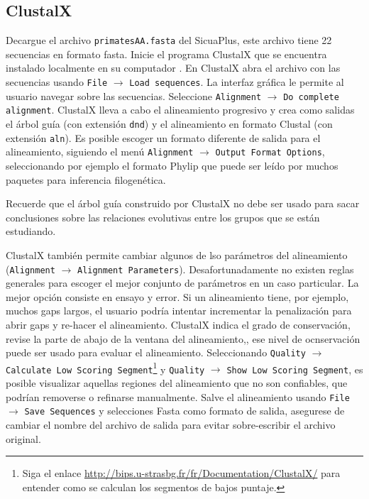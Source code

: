 \documentclass[letter,11pt]{book}
\begin{document}
\subsection{{\sc ClustalX}}

Decargue el archivo \Verb+primatesAA.fasta+ del SicuaPlus, este archivo tiene 22 secuencias en formato fasta. Inicie el programa {\sc ClustalX} que se encuentra instalado localmente en su computador \citep{Thompson1994}. En {\sc ClustalX} abra el archivo con las secuencias usando \Verb+File+ $\longrightarrow$ \Verb+Load sequences+. La interfaz gráfica le permite al usuario navegar sobre las secuencias. Seleccione \Verb+Alignment+ $\longrightarrow$ \Verb+Do complete alignment+. {\sc ClustalX} lleva a cabo el alineamiento progresivo y crea como salidas el árbol guía (con extensión \Verb+dnd+) y el alineamiento en formato Clustal (con extensión \Verb+aln+). Es posible escoger un formato diferente de salida para el alineamiento, siguiendo el menú \Verb+Alignment+ $\longrightarrow$ \Verb+Output Format Options+, seleccionando por ejemplo el formato {\sc Phylip} que puede ser leído por muchos paquetes para inferencia filogenética.

Recuerde que el árbol guía construido por {\sc ClustalX} no debe ser usado para sacar conclusiones sobre las relaciones evolutivas entre los grupos que se están estudiando.

{\sc ClustalX} también permite cambiar algunos de lso parámetros del alineamiento (\Verb+Alignment+ $\longrightarrow$ \Verb+Alignment Parameters+). Desafortunadamente no existen reglas generales para escoger el mejor conjunto de parámetros en un caso particular. La mejor opción consiste en ensayo y error. Si un alineamiento tiene, por ejemplo, muchos gaps largos, el usuario podría intentar incrementar la penalización para abrir gaps y re-hacer el alineamiento. {\sc ClustalX} indica el grado de conservación, revise la parte de abajo de la ventana del alineamiento,, ese nivel de ocnservación puede ser usado para evaluar el alineamiento. Seleccionando \Verb+Quality+ $\longrightarrow$ \Verb+Calculate Low Scoring Segment+\footnote{Siga el enlace \url{http://bips.u-strasbg.fr/fr/Documentation/ClustalX/} para entender como se calculan los segmentos de bajos puntaje.} y \Verb+Quality+ $\longrightarrow$ \Verb+Show Low Scoring Segment+, es posible visualizar aquellas regiones del alineamiento que no son confiables, que podrían removerse o refinarse manualmente. Salve el alineamiento usando \Verb+File+ $\longrightarrow$ \Verb+Save Sequences+ y selecciones {\sc Fasta} como formato de salida, asegurese de cambiar el nombre del archivo de salida para evitar sobre-escribir el archivo original.
\end{document}
